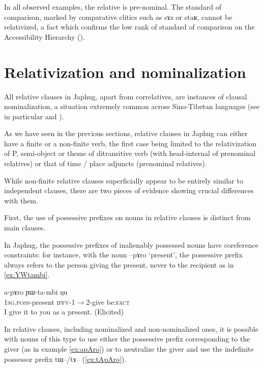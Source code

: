 \documentclass[oldfontcommands,oneside,a4paper,11pt]{article}
\newcommand{\ipa}[1]{{\phon #1}} %
\begin{document}
   In all observed examples, the relative is pre-nominal. The standard of comparison, marked by comparative clitics such as \ipa{sɤz} or \ipa{staʁ}, cannot be relativized, a fact which confirms the low rank of standard of comparison on the Accessibility Hierarchy (\citealt{keenan77accessibility}).




\section{Relativization and nominalization} \label{sec:finite.relatives}

All relative clauses in Japhug, apart from correlatives, are instances of clausal nominalization, a situation extremely common across Sino-Tibetan languages (see in particular \citealt{genetti08nmlz} and \citealt{bickel99nmlz}).

As we have seen in the previous sections, relative clauses in Japhug can either have a finite or a non-finite verb, the first case being limited to the relativization of P, semi-object or theme of ditransitive verb (with head-internal of prenominal relatives) or that of time / place adjuncts (prenominal relatives). 

While non-finite relative clauses superficially appear to be entirely similar to independent clauses, there are two pieces of evidence showing crucial differences with them.

First, the use of possessive prefixes on nouns in relative clauses is distinct from main clauses.

In Japhug, the possessive prefixes of inalienably possessed nouns have coreference constraints: for instance, with the noun \ipa{--pɤro} `present', the possessive prefix always refers to the person giving the present, never to the recipient as in \ref{ex:YWtambi}. 
	
			\begin{exe}
\ex \label{ex:YWtambi}
\gll
	\ipa{a-pɤro}  	\ipa{ɲɯ-ta-mbi}  	\ipa{ŋu}  \\
	\textsc{1sg.poss}-present \textsc{ipfv}-1$\rightarrow$2-give be:\textsc{fact} \\
	\glt I give it to you as a present. (Elicited)
 	  \end{exe} 
	 
In relative clauses, including nominalized and non-nominalized ones, it is possible with nouns of this type to use either the possessive prefix corresponding to the giver (as in example \ref{ex:apAro}) or to neutralize the giver and use the indefinite possessor prefix \ipa{tɯ}--/\ipa{tɤ}-- (\ref{ex:tApAro}).
	 
\end{document}
